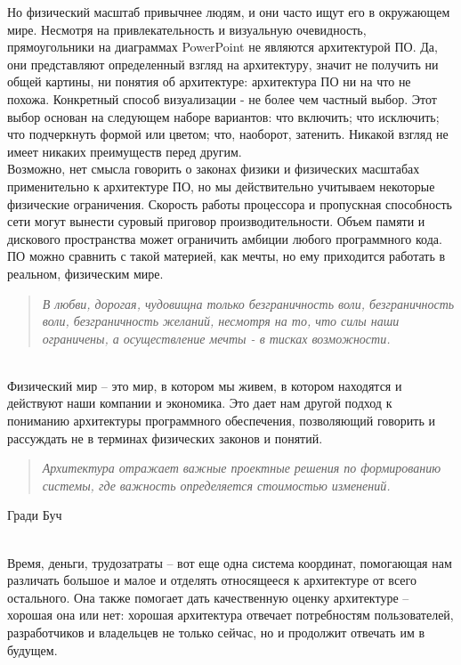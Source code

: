 \documentclass[a4paper, 12pt]{report}
\begin{document}
{    Но физический масштаб привычнее людям, и они часто ищут его в окружающем мире. Несмотря на привлекательность и визуальную очевидность, прямоугольники на диаграммах PowerPoint не являются архитектурой ПО. Да, они представляют определенный взгляд на архитектуру, значит не получить ни общей картины, ни понятия об архитектуре: архитектура ПО ни на что не похожа.
    Конкретный способ визуализации - не более чем частный выбор. Этот выбор основан на следующем наборе вариантов: что включить; что исключить; что подчеркнуть формой или цветом; что, наоборот, затенить. Никакой взгляд не имеет никаких преимуществ перед другим.\\
    Возможно, нет смысла говорить о законах физики и физических масштабах применительно к архитектуре ПО, но мы действительно учитываем некоторые физические ограничения. Скорость работы процессора и пропускная способность сети могут вынести суровый приговор производительности. Объем памяти и дискового пространства может ограничить амбиции любого программного кода. ПО можно сравнить с такой материей, как мечты, но ему приходится работать в реальном, физическим мире.\\
    \begin{quote}
        \textit{В любви, дорогая, чудовищна только безграничность воли, безграничность воли, безграничность желаний, несмотря на то, что силы наши ограничены, а осуществление мечты - в тисках возможности.}
    \end{quote}
    \begin{flushright}
    \end{flushright}\\
    Физический мир – это мир, в котором мы живем, в котором находятся и действуют наши компании и экономика. Это дает нам другой подход к пониманию архитектуры программного обеспечения, позволяющий говорить и рассуждать не в терминах физических законов и понятий.
    \begin{quote}
        \textit{Архитектура отражает важные проектные решения по формированию системы, где важность определяется стоимостью изменений.}
    \end{quote}
    \begin{flushright}
        Гради Буч
    \end{flushright}\\
    Время, деньги, трудозатраты – вот еще одна система координат, помогающая нам различать большое и малое и отделять относящееся к архитектуре от всего остального. Она также помогает дать качественную оценку архитектуре – хорошая она или нет: хорошая архитектура отвечает потребностям пользователей, разработчиков и владельцев не только сейчас, но и продолжит отвечать им в будущем.
}
\end{document}
